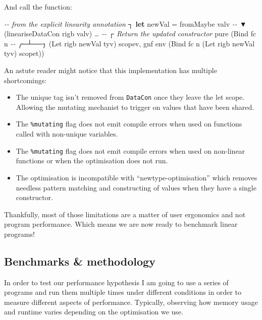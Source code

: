 \documentclass[
]{article}
\newenvironment{Shaded}{}{}
\newcommand{\CommentTok}[1]{\textcolor[rgb]{0.38,0.63,0.69}{\textit{#1}}}
\newcommand{\DataTypeTok}[1]{\textcolor[rgb]{0.56,0.13,0.00}{#1}}
\newcommand{\FunctionTok}[1]{\textcolor[rgb]{0.02,0.16,0.49}{#1}}
\newcommand{\KeywordTok}[1]{\textcolor[rgb]{0.00,0.44,0.13}{\textbf{#1}}}
\newcommand{\NormalTok}[1]{#1}
\newcommand{\OtherTok}[1]{\textcolor[rgb]{0.00,0.44,0.13}{#1}}
\providecommand{\tightlist}{%
  \setlength{\itemsep}{0pt}\setlength{\parskip}{0pt}}
\begin{document}
And call the function:

\begin{Shaded}
\begin{Highlighting}[]
\CommentTok{{-}{-}  from the explicit linearity annotation ┐}
\KeywordTok{let}\NormalTok{ newVal }\OtherTok{=}\NormalTok{ fromMaybe valv }\CommentTok{{-}{-}             ▼}
\NormalTok{                       (lineariseDataCon rigb valv)}
\NormalTok{…}
                \CommentTok{{-}{-}   ┌ Return the updated constructor}
\FunctionTok{pure}\NormalTok{ (}\DataTypeTok{Bind}\NormalTok{ fc n }\CommentTok{{-}{-} ╭─┴──╮}
\NormalTok{         (}\DataTypeTok{Let}\NormalTok{ rigb newVal tyv) scopev,}
\NormalTok{         gnf env (}\DataTypeTok{Bind}\NormalTok{ fc n (}\DataTypeTok{Let}\NormalTok{ rigb newVal\textquotesingle{} tyv) scopet))}
\end{Highlighting}
\end{Shaded}

An astute reader might notice that this implementation has multiple
shortcomings:

\begin{itemize}
\tightlist
\item
  The unique tag isn't removed from \texttt{DataCon} once they leave the
  let scope. Allowing the mutating mechanist to trigger on values that
  have been shared.
\item
  The \texttt{\%mutating} flag does not emit compile errors when used on
  functions called with non-unique variables.
\item
  The \texttt{\%mutating} flag does not emit compile errors when used on
  non-linear functions or when the optimisation does not run.
\item
  The optimisation is incompatible with ``newtype-optimisation'' which
  removes needless pattern matching and constructing of values when they
  have a single constructor.
\end{itemize}

Thankfully, most of those limitations are a matter of user ergonomics
and not program performance. Which means we are now ready to benchmark
linear programs!

\hypertarget{benchmarks-methodology}{%
\subsection{Benchmarks \& methodology}\label{benchmarks-methodology}}

In order to test our performance hypothesis I am going to use a series
of programs and run them multiple times under different conditions in
order to measure different aspects of performance. Typically, observing
how memory usage and runtime varies depending on the optimisation we
use.
\end{document}
